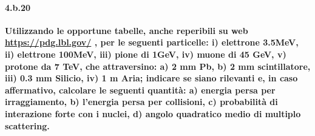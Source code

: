\documentclass[twoside]{article}
\begin{document}
\paragraph{4.b.20}\textbf{Utilizzando le opportune tabelle, anche reperibili su web \url{https://pdg.lbl.gov/} , per
le seguenti particelle: i) elettrone 3.5MeV, ii) elettrone 100MeV, iii) pione di
1GeV, iv) muone di 45 GeV, v) protone da 7 TeV, che attraversino: a) 2
mm Pb, b) 2 mm scintillatore, iii) 0.3 mm Silicio, iv) 1 m Aria; indicare se
siano rilevanti e, in caso affermativo, calcolare le seguenti quantità: a) energia
persa per irraggiamento, b) l’energia persa per collisioni, c) probabilità di
interazione forte con i nuclei, d) angolo quadratico medio di multiplo scattering.} \\ \\
\end{document}
